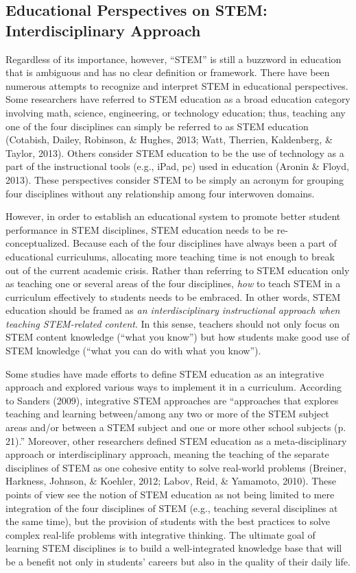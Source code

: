 \documentclass[11.5pt]{sig-alternate} %
\begin{document}
\begin{large}
\subsection*{Educational Perspectives on STEM: Interdisciplinary Approach}

Regardless of its importance, however, “STEM” is still a buzzword in education that is ambiguous and has no clear definition or framework.  There have been numerous attempts to recognize and interpret STEM in educational perspectives.  Some researchers have referred to STEM education as a broad education category involving math, science, engineering, or technology education; thus, teaching any one of the four disciplines can simply be referred to as STEM education (Cotabish, Dailey, Robinson, \& Hughes, 2013; Watt, Therrien, Kaldenberg, \& Taylor, 2013).  Others consider STEM education to be the use of technology as a part of the instructional tools (e.g., iPad, pc) used in education (Aronin \& Floyd, 2013).  These perspectives consider STEM to be simply an acronym for grouping four disciplines without any relationship among four interwoven domains. 

However, in order to establish an educational system to promote better student performance in STEM disciplines, STEM education needs to be re-conceptualized.  Because each of the four disciplines have always been a part of educational curriculums, allocating more teaching time is not enough to break out of the current academic crisis.  Rather than referring to STEM education only as teaching one or several areas of the four disciplines, \textit{how} to teach STEM in a curriculum effectively to students needs to be embraced. In other words, STEM education should be framed as \textit{an interdisciplinary instructional approach when teaching STEM-related content}.  In this sense, teachers should not only focus on STEM content knowledge (“what you know”) but how students make good use of STEM knowledge (“what you can do with what you know”).
	
 Some studies have made efforts to define STEM education as an integrative approach and explored various ways to implement it in a curriculum. According to Sanders (2009), integrative STEM approaches are “approaches that explores teaching and learning between/among any two or more of the STEM subject areas and/or between a STEM subject and one or more other school subjects (p. 21).”  Moreover, other researchers defined STEM education as a meta-disciplinary approach or interdisciplinary approach, meaning the teaching of the separate disciplines of STEM as one cohesive entity to solve real-world problems (Breiner, Harkness, Johnson, \& Koehler, 2012; Labov, Reid, \& Yamamoto, 2010).  These points of view see the notion of STEM education as not being limited to mere integration of the four disciplines of STEM (e.g., teaching several disciplines at the same time), but the provision of students with the best practices to solve complex real-life problems with integrative thinking.  The ultimate goal of learning STEM disciplines is to build a well-integrated knowledge base that will be a benefit not only in students’ careers but also in the quality of their daily life.
	

\end{large}
\end{document}
